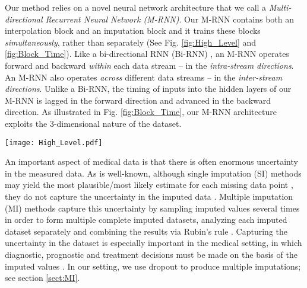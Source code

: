 \documentclass{article}
\begin{document}
	Our method relies on a novel neural network architecture that we call a {\em Multi-directional Recurrent Neural Network (M-RNN)}.  Our M-RNN contains both an interpolation block and  an imputation block and it trains these blocks {\em simultaneously}, rather than separately (See Fig. \ref{fig:High_Level} and \ref{fig:Block_Time}). Like a bi-directional RNN (Bi-RNN) \cite{BiRNN}, an M-RNN operates forward and backward {\em within} each data stream -- in the {\em intra-stream directions}.  An M-RNN also operates {\em across} different data streams -- in the {\em inter-stream directions}. Unlike a Bi-RNN, the timing of inputs into the hidden layers of our M-RNN is lagged in the forward direction and advanced in the backward direction. As illustrated in Fig. \ref{fig:Block_Time}, our M-RNN architecture exploits the 3-dimensional nature of the dataset. 
	
	\begin{figure*}[t!]
		\center
		\texttt{[image: High\_Level.pdf]}
		\caption{Block diagram of missing data estimation process: X = missing measurements; red lines = connections between observed values and missing values in each layer; blue lines = connections between interpolated values; dashed lines = dropout}
		\label{fig:High_Level}
	\end{figure*}
    
	An important aspect of medical data is that there is often enormous uncertainty in the measured data.  As is well-known, although single imputation (SI) methods may yield the most plausible/most likely estimate for each missing data point \cite{singleimpute}, they do not capture the uncertainty in the imputed data \cite{Rubin}. Multiple imputation (MI) methods capture this uncertainty by sampling imputed values several times in order to form multiple complete imputed datasets, analyzing each imputed dataset separately and combining the results  via Rubin's rule  \cite{Rubin,Multipleimpute1,reason_of_imputation1}. Capturing the uncertainty in the dataset is especially important in the medical setting, in which diagnostic, prognostic and treatment decisions must be made on the basis of the imputed values \cite{Medimpute2, Medimpute3}.  In our setting, we use dropout \cite{Dropout} to produce multiple imputations; see section \ref{sect:MI}.
	
\end{document}
